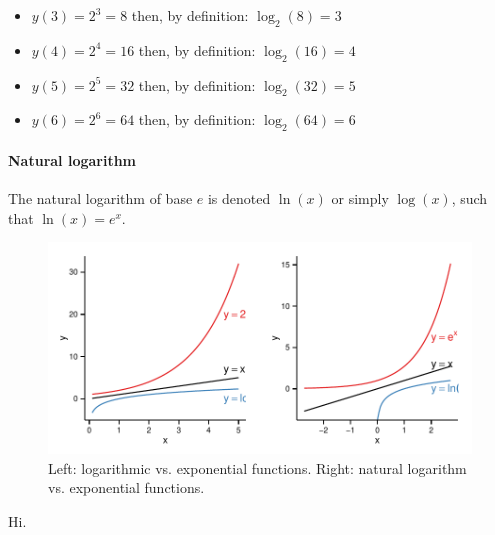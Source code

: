 \begin{itemize}
  \item $y(3) = 2^3 = 8$ \quad then, by definition: \quad $\log_2(8) = 3$
  \item $y(4) = 2^4 = 16$ \quad then, by definition: \quad $\log_2(16) = 4$
  \item $y(5) = 2^5 = 32$ \quad then, by definition: \quad $\log_2(32) = 5$
  \item $y(6) = 2^6 = 64$ \quad then, by definition: \quad $\log_2(64) = 6$
\end{itemize}

%
\paragraph{Natural logarithm}

The natural logarithm of base $e$ is denoted $\ln(x)$ or simply $\log(x)$, such that $\ln(x)=e^x$.

\begin{knitrout}
\color{fgcolor}\begin{figure}[]

\includegraphics[width=\linewidth]{images/math-exps-and-logs} \caption{Left: logarithmic vs. exponential functions. Right: natural logarithm vs. exponential functions.\label{fig:exps-and-logs}}
\end{figure}


\end{knitrout}


Hi.


